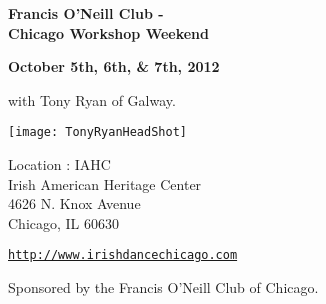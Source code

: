 \begin{center}
{\Large\textbf{Francis O'Neill Club - \\ Chicago Workshop Weekend}}\\ 
\end{center}

\begin{center}
\textbf{October 5th, 6th, \&  7th, 2012} 


\vspace*{0.25em}
with Tony Ryan of Galway.
\end{center}

\vspace*{0.45em}
\begin{center}
\texttt{[image: TonyRyanHeadShot]}
\end{center}

\vspace*{2.5em}
Location : IAHC\\
Irish American Heritage Center\\
4626 N. Knox Avenue\\
Chicago, IL  60630 

\begin{center}
\vspace*{2em}
\href{http://www.irishdancechicago.com}{\tt http://www.irishdancechicago.com} 

{\small Sponsored by the Francis O'Neill Club of Chicago.}
\end{center}
